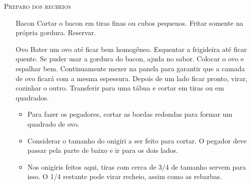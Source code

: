 {	\textsc{Preparo dos recheios}
	\begin{enumerate}
		\item[Bacon] Cortar o bacon em tiras finas ou cubos pequenos. Fritar somente
		      na própria gordura. Reservar.
		\item[Ovo] Bater um ovo até ficar bem homogêneo. Esquentar a frigideira até
		      ficar quente. Se puder usar a gordura do bacon, ajuda no sabor. Colocar o
		      ovo e espalhar bem. Continuamente mexer na panela para garantir que a
		      camada de ovo ficará com a mesma espessura. Depois de um lado ficar
		      pronto, virar, cozinhar o outro. Transferir para uma tábua e cortar em
		      tiras ou em quadrados.
          \begin{itemize}
          \item Para fazer os pegadores, cortar as bordas redondas para formar
            um quadrado de ovo.
          \item Considerar o tamanho do onigiri a ser feito para cortar. O
            pegador deve passar pela parte de baixo e ir para os dois lados.
          \item Nos onigiris feitos aqui, tiras com cerca de 3/4 de tamanho
            servem para isso. O 1/4 restante pode virar recheio, assim como as
            rebarbas.
          \end{itemize}
	\end{enumerate}

}


